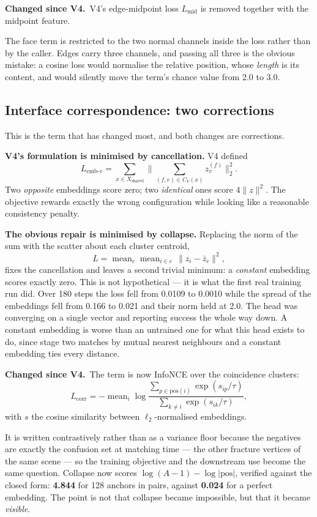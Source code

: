 \documentclass[11pt,a4paper]{report}
\newcommand{\change}[1]{\par\vspace{2pt}\noindent\textcolor{soft}{\small\textbf{Changed since V4.}\ #1}\par\vspace{2pt}}
\newcommand{\measured}[1]{\textbf{#1}}
\begin{document}
\change{V4's edge-midpoint loss $L_{\text{mid}}$ is removed together with the
midpoint feature.}

The face term is restricted to the two normal channels inside the loss rather
than by the caller. Edges carry three channels, and passing all three is the
obvious mistake: a cosine loss would normalise the relative position, whose
\emph{length} is its content, and would silently move the term's chance value
from 2.0 to 3.0.

\subsection{Interface correspondence: two corrections}
\label{sub:corr}

This is the term that has changed most, and both changes are corrections.

\textbf{V4's formulation is minimised by cancellation.} V4 defined
\[
L_{\text{emb-}v} = \sum_{x \in X_{\text{shared}}}
\Big\lVert \sum_{(f,v) \in C_V(x)} z^{(f)}_v \Big\rVert_2^2 .
\]
Two \emph{opposite} embeddings score zero; two \emph{identical} ones score
$4\lVert z\rVert^2$. The objective rewards exactly the wrong configuration while
looking like a reasonable consistency penalty.

\textbf{The obvious repair is minimised by collapse.} Replacing the norm of the
sum with the scatter about each cluster centroid,
\[
L = \operatorname{mean}_c \operatorname{mean}_{i \in c}\, \lVert z_i - \bar{z}_c \rVert^2 ,
\]
fixes the cancellation and leaves a second trivial minimum: a \emph{constant}
embedding scores exactly zero. This is not hypothetical --- it is what the first
real training run did. Over 180 steps the loss fell from 0.0109 to 0.0010 while
the spread of the embeddings fell from 0.166 to 0.021 and their norm held at
2.0. The head was converging on a single vector and reporting success the whole
way down. A constant embedding is worse than an untrained one for what this head
exists to do, since stage two matches by mutual nearest neighbours and a
constant embedding ties every distance.

\change{The term is now InfoNCE over the coincidence clusters:
\[
L_{\text{corr}} = -\operatorname{mean}_i \log
\frac{\sum_{p \in \mathrm{pos}(i)} \exp(s_{ip}/\tau)}
     {\sum_{k \neq i} \exp(s_{ik}/\tau)},
\]
with $s$ the cosine similarity between $\ell_2$-normalised embeddings.}

It is written contrastively rather than as a variance floor because the
negatives are exactly the confusion set at matching time --- the other fracture
vertices of the same scene --- so the training objective and the downstream use
become the same question. Collapse now scores $\log(A-1) - \log|\mathrm{pos}|$,
verified against the closed form: \measured{4.844} for 128 anchors in pairs,
against \measured{0.024} for a perfect embedding. The point is not that collapse
became impossible, but that it became \emph{visible}.
\end{document}
